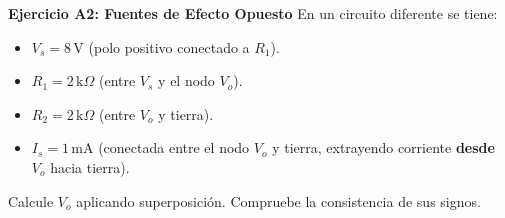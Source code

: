 \documentclass[11pt, a4paper]{article}
\begin{document}
\vspace{5cm}

\textbf{Ejercicio A2: Fuentes de Efecto Opuesto}
En un circuito diferente se tiene:
\begin{itemize}
    \item $V_s = 8\,\text{V}$ (polo positivo conectado a $R_1$).
    \item $R_1 = 2\,\text{k}\Omega$ (entre $V_s$ y el nodo $V_o$).
    \item $R_2 = 2\,\text{k}\Omega$ (entre $V_o$ y tierra).
    \item $I_s = 1\,\text{mA}$ (conectada entre el nodo $V_o$ y tierra, extrayendo corriente \textbf{desde} $V_o$ hacia tierra).
\end{itemize}
Calcule $V_o$ aplicando superposición. Compruebe la consistencia de sus signos.
\end{document}
